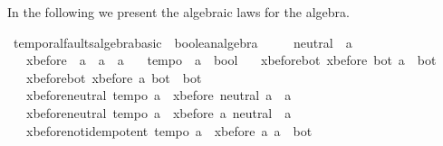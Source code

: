%
\begin{isabellebody}%
%
%
\isamarkuptrue%
%
\begin{isamarkuptext}%
\label{sec:theory-algebra}%
\end{isamarkuptext}\isamarkuptrue%
%
\isadelimtheory
%
\endisadelimtheory
%
\isatagtheory
%
\endisatagtheory
{\isafoldtheory}%
%
\isadelimtheory
%
\endisadelimtheory
%
\begin{isamarkuptext}%
In the following we present the algebraic laws for the \ac{algebra}.%
\end{isamarkuptext}\isamarkuptrue%
%
\isamarkuptrue%
\isamarkupfalse%
\ temporal{\isacharunderscore}faults{\isacharunderscore}algebra{\isacharunderscore}basic\ {\isacharequal}\ boolean{\isacharunderscore}algebra\ \ {\isacharplus}\isanewline
\ \ \ neutral\ {\isacharcolon}{\isacharcolon}\ {\isachardoublequoteopen}{\isacharprime}a{\isachardoublequoteclose}\isanewline
\ \ \ xbefore\ {\isacharcolon}{\isacharcolon}\ {\isachardoublequoteopen}{\isacharprime}a\ {\isasymRightarrow}\ {\isacharprime}a\ {\isasymRightarrow}\ {\isacharprime}a{\isachardoublequoteclose}\isanewline
\ \ \ tempo{}\ {\isacharcolon}{\isacharcolon}\ {\isachardoublequoteopen}{\isacharprime}a\ {\isasymRightarrow}\ bool{\isachardoublequoteclose}\isanewline
\ \ \ xbefore{\isacharunderscore}bot{\isacharunderscore}{}{\isacharcolon}\ {\isachardoublequoteopen}xbefore\ bot\ a\ {\isacharequal}\ bot{\isachardoublequoteclose}\isanewline
\ \ \ xbefore{\isacharunderscore}bot{\isacharunderscore}{}{\isacharcolon}\ {\isachardoublequoteopen}xbefore\ a\ bot\ {\isacharequal}\ bot{\isachardoublequoteclose}\isanewline
\ \ \ xbefore{\isacharunderscore}neutral{\isacharunderscore}{}{\isacharcolon}\ {\isachardoublequoteopen}tempo{}\ a\ {\isasymLongrightarrow}\ xbefore\ neutral\ a\ {\isacharequal}\ a{\isachardoublequoteclose}\isanewline
\ \ \ xbefore{\isacharunderscore}neutral{\isacharunderscore}{}{\isacharcolon}\ {\isachardoublequoteopen}tempo{}\ a\ {\isasymLongrightarrow}\ xbefore\ a\ neutral\ {\isacharequal}\ a{\isachardoublequoteclose}\isanewline
\ \ \ xbefore{\isacharunderscore}not{\isacharunderscore}idempotent{\isacharcolon}\ {\isachardoublequoteopen}tempo{}\ a\ {\isasymLongrightarrow}\ xbefore\ a\ a\ {\isacharequal}\ bot{\isachardoublequoteclose}\isanewline

\end{isabellebody}
